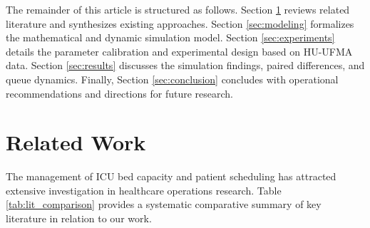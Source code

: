 \documentclass{ro}
\begin{document}
The remainder of this article is structured as follows. Section \ref{sec:works} reviews related literature and synthesizes existing approaches. Section \ref{sec:modeling} formalizes the mathematical and dynamic simulation model. Section \ref{sec:experiments} details the parameter calibration and experimental design based on HU-UFMA data. Section \ref{sec:results} discusses the simulation findings, paired differences, and queue dynamics. Finally, Section \ref{sec:conclusion} concludes with operational recommendations and directions for future research.

\section{Related Work}
\label{sec:works}

The management of ICU bed capacity and patient scheduling has attracted extensive investigation in healthcare operations research. Table \ref{tab:lit_comparison} provides a systematic comparative summary of key literature in relation to our work.
\end{document}
